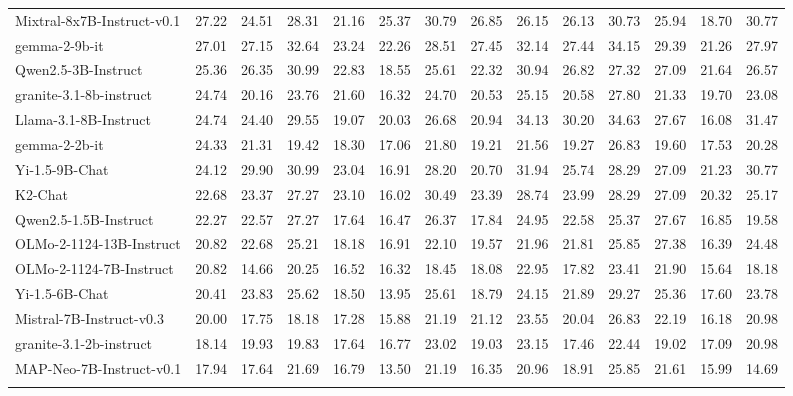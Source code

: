 {\begin{table}[H]
{\begin{tabular}{lccccccccccccc}
\rowcolor{color22}
Mixtral-8x7B-Instruct-v0.1& 27.22& 24.51& 28.31& 21.16& 25.37& 30.79& 26.85& 26.15& 26.13& 30.73& 25.94& 18.70& 30.77 \\
\rowcolor{color22}
gemma-2-9b-it& 27.01& 27.15& 32.64& 23.24& 22.26& 28.51& 27.45& 32.14& 27.44& 34.15& 29.39& 21.26& 27.97 \\
\rowcolor{color22}
Qwen2.5-3B-Instruct& 25.36& 26.35& 30.99& 22.83& 18.55& 25.61& 22.32& 30.94& 26.82& 27.32& 27.09& 21.64& 26.57 \\
\rowcolor{color22}
granite-3.1-8b-instruct& 24.74& 20.16& 23.76& 21.60& 16.32& 24.70& 20.53& 25.15& 20.58& 27.80& 21.33& 19.70& 23.08 \\
\rowcolor{color22}
Llama-3.1-8B-Instruct& 24.74& 24.40& 29.55& 19.07& 20.03& 26.68& 20.94& 34.13& 30.20& 34.63& 27.67& 16.08& 31.47 \\
\rowcolor{color22}
gemma-2-2b-it& 24.33& 21.31& 19.42& 18.30& 17.06& 21.80& 19.21& 21.56& 19.27& 26.83& 19.60& 17.53& 20.28 \\
\rowcolor{color22}
Yi-1.5-9B-Chat& 24.12& 29.90& 30.99& 23.04& 16.91& 28.20& 20.70& 31.94& 25.74& 28.29& 27.09& 21.23& 30.77 \\
\rowcolor{color22}
K2-Chat& 22.68& 23.37& 27.27& 23.10& 16.02& 30.49& 23.39& 28.74& 23.99& 28.29& 27.09& 20.32& 25.17 \\
\rowcolor{color22}
Qwen2.5-1.5B-Instruct& 22.27& 22.57& 27.27& 17.64& 16.47& 26.37& 17.84& 24.95& 22.58& 25.37& 27.67& 16.85& 19.58 \\
\rowcolor{color22}
OLMo-2-1124-13B-Instruct& 20.82& 22.68& 25.21& 18.18& 16.91& 22.10& 19.57& 21.96& 21.81& 25.85& 27.38& 16.39& 24.48 \\
\rowcolor{color22}
OLMo-2-1124-7B-Instruct& 20.82& 14.66& 20.25& 16.52& 16.32& 18.45& 18.08& 22.95& 17.82& 23.41& 21.90& 15.64& 18.18 \\
\rowcolor{color22}
Yi-1.5-6B-Chat& 20.41& 23.83& 25.62& 18.50& 13.95& 25.61& 18.79& 24.15& 21.89& 29.27& 25.36& 17.60& 23.78 \\
\rowcolor{color22}
Mistral-7B-Instruct-v0.3& 20.00& 17.75& 18.18& 17.28& 15.88& 21.19& 21.12& 23.55& 20.04& 26.83& 22.19& 16.18& 20.98 \\
\rowcolor{color22}
granite-3.1-2b-instruct& 18.14& 19.93& 19.83& 17.64& 16.77& 23.02& 19.03& 23.15& 17.46& 22.44& 19.02& 17.09& 20.98 \\
\rowcolor{color22}
MAP-Neo-7B-Instruct-v0.1& 17.94& 17.64& 21.69& 16.79& 13.50& 21.19& 16.35& 20.96& 18.91& 25.85& 21.61& 15.99& 14.69 \\
\rowcolor{color22}

\end{tabular}}
\end{table}}
